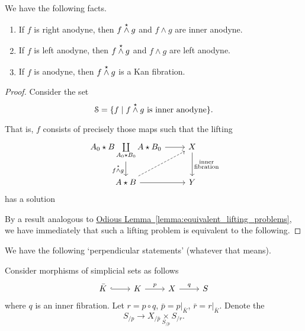 \documentclass[main.tex]{subfiles}
\begin{document}
\begin{proposition}
  We have the following facts.
  \begin{enumerate}
    \item If $f$ is right anodyne, then $f \overset{\star}{\wedge} g$ and $f \wedge g$ are inner anodyne.

    \item If $f$ is left anodyne, then $f \overset{\star}{\wedge} g$ and $f \wedge g$ are left anodyne.

    \item If $f$ is anodyne, then $f \overset{\star}{\wedge} g$ is a Kan fibration.
  \end{enumerate}
\end{proposition}
\begin{proof}
  Consider the set
  \begin{equation*}
    \mathcal{S} = \{f \mid f \overset{\star}{\wedge} g \text{ is inner anodyne}\}.
  \end{equation*}

  That is, $f$ consists of precisely those maps such that the lifting
  \begin{equation*}
    \begin{tikzcd}
      A_{0} \star B \coprod\limits_{A_{0} \star B_{0}} A \star B_{0}
      \arrow[r]
      \arrow[d, swap, "f \ssmash g"]
      & X
      \arrow[d, "\substack{\text{inner}\\\text{fibration}}"]
      \\
      A \star B
      \arrow[r]
      \arrow[ur, dashed]
      & Y
    \end{tikzcd}
  \end{equation*}
  has a solution

  By a result analogous to \hyperref[lemma:equivalent_lifting_problems]{Odious Lemma~\ref*{lemma:equivalent_lifting_problems}}, we have immediately that such a lifting problem is equivalent to the following.

\end{proof}


We have the following `perpendicular statements' (whatever that means).

\begin{fact}
  Consider morphisms of simplicial sets as follows
  \begin{equation*}
    \begin{tikzcd}
      \bar{K}
      \arrow[r, hookrightarrow]
      & K
      \arrow[r, "p"]
      & X
      \arrow[r, "q"]
      & S
    \end{tikzcd}
  \end{equation*}
  where $q$ is an inner fibration. Let $r = p \circ q$, $\bar{p} = p|_{\bar{K}}$, $\bar{r} = r|_{\bar{K}}$. Denote the
  \begin{equation*}
    S_{/p} \to X_{/\bar{p}} \underset{S_{/\bar{p}}}{\times} S_{/r}.
  \end{equation*}
\end{fact}
\end{document}
